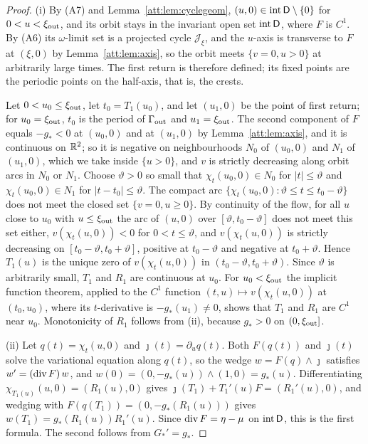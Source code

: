 \begin{proof}
(i) By (A7) and Lemma~\ref{att:lem:cyclegeom}, $(u,0)\in\operatorname{int}\mathsf D\setminus\{0\}$ for $0<u<\xi_{\rm out}$, and its orbit stays in the invariant open set $\operatorname{int}\mathsf D$, where $F$ is $C^1$. By (A6) its $\omega$-limit set is a projected cycle $\mathcal J_\xi$, and the $u$-axis is transverse to $F$ at $(\xi,0)$ by Lemma~\ref{att:lem:axis}, so the orbit meets $\{v=0,u>0\}$ at arbitrarily large times. The first return is therefore defined; its fixed points are the periodic points on the half-axis, that is, the crests.

Let $0<u_0\le\xi_{\rm out}$, let $t_0=T_1(u_0)$, and let $(u_1,0)$ be the point of first return; for $u_0=\xi_{\rm out}$, $t_0$ is the period of $\Gamma_{\rm out}$ and $u_1=\xi_{\rm out}$. The second component of $F$ equals $-g_\ast<0$ at $(u_0,0)$ and at $(u_1,0)$ by Lemma~\ref{att:lem:axis}, and it is continuous on $\mathbb R^2$; so it is negative on neighbourhoods $N_0$ of $(u_0,0)$ and $N_1$ of $(u_1,0)$, which we take inside $\{u>0\}$, and $v$ is strictly decreasing along orbit arcs in $N_0$ or $N_1$. Choose $\vartheta>0$ so small that $\chi_t(u_0,0)\in N_0$ for $|t|\le\vartheta$ and $\chi_t(u_0,0)\in N_1$ for $|t-t_0|\le\vartheta$. The compact arc $\{\chi_t(u_0,0):\vartheta\le t\le t_0-\vartheta\}$ does not meet the closed set $\{v=0,u\ge0\}$. By continuity of the flow, for all $u$ close to $u_0$ with $u\le\xi_{\rm out}$ the arc of $(u,0)$ over $[\vartheta,t_0-\vartheta]$ does not meet this set either, $v(\chi_t(u,0))<0$ for $0<t\le\vartheta$, and $v(\chi_t(u,0))$ is strictly decreasing on $[t_0-\vartheta,t_0+\vartheta]$, positive at $t_0-\vartheta$ and negative at $t_0+\vartheta$. Hence $T_1(u)$ is the unique zero of $v(\chi_t(u,0))$ in $(t_0-\vartheta,t_0+\vartheta)$. Since $\vartheta$ is arbitrarily small, $T_1$ and $R_1$ are continuous at $u_0$. For $u_0<\xi_{\rm out}$ the implicit function theorem, applied to the $C^1$ function $(t,u)\mapsto v(\chi_t(u,0))$ at $(t_0,u_0)$, where its $t$-derivative is $-g_\ast(u_1)\ne0$, shows that $T_1$ and $R_1$ are $C^1$ near $u_0$. Monotonicity of $R_1$ follows from (ii), because $g_\ast>0$ on $(0,\xi_{\rm out}]$.

(ii) Let $q(t)=\chi_t(u,0)$ and $\jmath(t)=\partial_uq(t)$. Both $F(q(t))$ and $\jmath(t)$ solve the variational equation along $q(t)$, so the wedge $w=F(q)\wedge\jmath$ satisfies $w'=(\operatorname{div} F)\,w$, and $w(0)=(0,-g_\ast(u))\wedge(1,0)=g_\ast(u)$. Differentiating $\chi_{T_1(u)}(u,0)=(R_1(u),0)$ gives $\jmath(T_1)+T_1'(u)F=(R_1'(u),0)$, and wedging with $F(q(T_1))=(0,-g_\ast(R_1(u)))$ gives $w(T_1)=g_\ast(R_1(u))R_1'(u)$. Since $\operatorname{div} F=\eta-\mu$ on $\operatorname{int}\mathsf D$, this is the first formula. The second follows from $G_\ast'=g_\ast$.


\end{proof}
